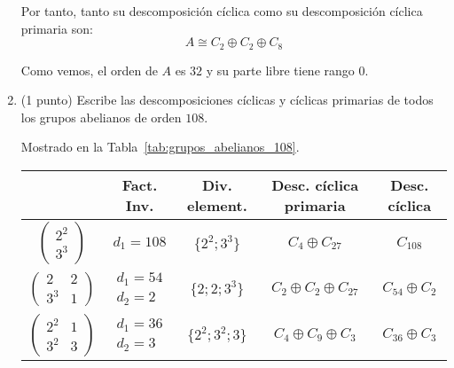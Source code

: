 \documentclass[12pt]{article}
\begin{document}
\begin{ejercicio}
\begin{enumerate}
                Por tanto, tanto su descomposición cíclica como su descomposición cíclica primaria son:
                \begin{equation*}
                    A \cong C_2 \oplus C_2 \oplus C_8
                \end{equation*}

                Como vemos, el orden de $A$ es $32$ y su parte libre tiene rango $0$.
            \item (1 punto) Escribe las descomposiciones cíclicas y cíclicas primarias de todos los grupos abelianos de orden $108$.
            
            Mostrado en la Tabla~\ref{tab:grupos_abelianos_108}.
        \begin{table}[h]
            \centering
            \begin{tabular}{c|c|c|c|c}
                & \textbf{Fact. Inv.} & \textbf{Div. element.} & \textbf{Desc. cíclica primaria} & \textbf{Desc. cíclica} \\
                \hline
                $\begin{pmatrix}
                    2^2\\
                    3^3
                \end{pmatrix}
                $ & $d_1=108$ & $\{2^2; 3^3\}$ & $C_4 \oplus C_{27}$ & $C_{108}$ \\ \hline
                $\begin{pmatrix}
                    2 & 2\\
                    3^3 & 1
                \end{pmatrix}
                $ & $\begin{array}{l}
                    d_1=54 \\
                    d_2=2
                \end{array}$ & $\{2; 2; 3^3\}$ & $C_2 \oplus C_2 \oplus C_{27}$ & $C_{54} \oplus C_2$ \\ \hline
                $\begin{pmatrix}
                    2^2 & 1\\
                    3^2 & 3
                \end{pmatrix}
                $ & $\begin{array}{l}
                    d_1=36 \\
                    d_2=3
                \end{array}$ & $\{2^2; 3^2; 3\}$ & $C_4 \oplus C_9 \oplus C_3$ & $C_{36} \oplus C_3$ \\ \hline

\end{tabular}
\end{table}
\end{enumerate}
\end{ejercicio}
\end{document}
